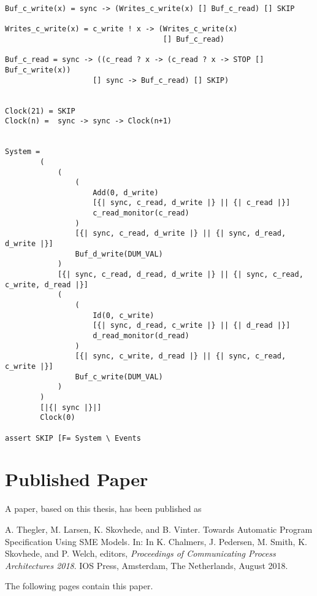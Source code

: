 \begin{verbatim}
Buf_c_write(x) = sync -> (Writes_c_write(x) [] Buf_c_read) [] SKIP

Writes_c_write(x) = c_write ! x -> (Writes_c_write(x)
                                    [] Buf_c_read)

Buf_c_read = sync -> ((c_read ? x -> (c_read ? x -> STOP [] Buf_c_write(x))
                    [] sync -> Buf_c_read) [] SKIP)


Clock(21) = SKIP
Clock(n) =  sync -> sync -> Clock(n+1)


System =
        (
            (
                (
                    Add(0, d_write)
                    [{| sync, c_read, d_write |} || {| c_read |}]
                    c_read_monitor(c_read)
                )
                [{| sync, c_read, d_write |} || {| sync, d_read, d_write |}]
                Buf_d_write(DUM_VAL)
            )
            [{| sync, c_read, d_read, d_write |} || {| sync, c_read, c_write, d_read |}]
            (
                (
                    Id(0, c_write)
                    [{| sync, d_read, c_write |} || {| d_read |}]
                    d_read_monitor(d_read)
                )
                [{| sync, c_write, d_read |} || {| sync, c_read, c_write |}]
                Buf_c_write(DUM_VAL)
            )
        )
        [|{| sync |}|]
        Clock(0)

assert SKIP [F= System \ Events
\end{verbatim}


\chapter{Published Paper}
\label{app:paper}
\noindent A paper, based on this thesis, has been published as

\begin{center}
\begin{minipage}{0.8\textwidth}
    A. Thegler, M. Larsen, K. Skovhede, and B. Vinter. Towards Automatic Program Specification Using SME Models. In: In K. Chalmers, J. Pedersen, M. Smith, K. Skovhede, and P. Welch,
    editors, {\itshape Proceedings of Communicating Process Architectures
    2018}. IOS Press, Amsterdam, The Netherlands,
    August 2018.
\end{minipage}
\end{center}
The following pages contain this paper.
